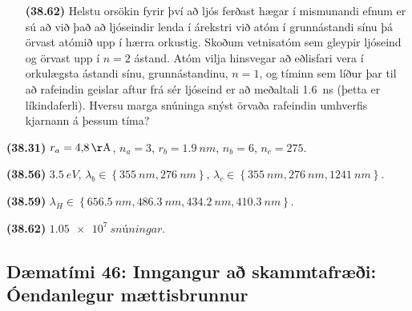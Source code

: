\begin{enumerate}[label = \textbf{(\alph*)}]
\item[\textbf{(38.62)}] Helstu orsökin fyrir því að ljós ferðast hægar í mismunandi efnum er sú að við það að ljóseindir lenda í árekstri við atóm í grunnástandi sínu þá örvast atómið upp í hærra orkustig. Skoðum vetnisatóm sem gleypir ljóseind og örvast upp í $n=2$ ástand. Atóm vilja hinsvegar að eðlisfari vera í orkulægsta ástandi sínu, grunnástandinu, $n=1$, og tíminn sem líður þar til að rafeindin geislar aftur frá sér ljóseind er að meðaltali \SI{1.6}{ns} (þetta er líkindaferli). Hversu marga snúninga snýst örvaða rafeindin umhverfis kjarnann á þessum tíma?

\end{enumerate}

\begin{tcolorbox}
\begin{enumerate*}[label = ]
  \item \textbf{(38.31)} $r_a = \SI{4.8}{\AA}$, $n_a = 3$, $r_b = \SI{1.9}{nm}$, $n_b = 6$, $n_c = 275$.
  \item \textbf{(38.56)} $\SI{3.5}{eV}$, $\lambda_b \in \left\{ \SI{355}{nm}, \SI{276}{nm}  \right\}$, $\lambda_c \in \left\{ \SI{355}{nm}, \SI{276}{nm}, \SI{1241}{nm}  \right\}$.
  \item \textbf{(38.59)} $\lambda_H \in \left\{ \SI{656.5}{nm}, \SI{486.3}{nm}, \SI{434.2}{nm}, \SI{410,3}{nm} \right\}$. \\
  \item \textbf{(38.62)} $\SI{1.05e7}{snúningar}$.
\end{enumerate*}
\end{tcolorbox}

\newpage

\subsection*{Dæmatími 46: Inngangur að skammtafræði: Óendanlegur mættisbrunnur}

